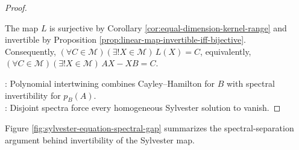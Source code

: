 \begin{theorem}
\begin{proof}
\begin{enumerate}[label=(\roman*)]
The map $L$ is surjective by Corollary \ref{cor:equal-dimension-kernel-range} and invertible by Proposition \ref{prop:linear-map-invertible-iff-bijective}.\\
Consequently, $(\forall C\in\mathcal{M})(\exists!X\in\mathcal{M})\,L(X)=C$, equivalently, $(\forall C\in\mathcal{M})(\exists!X\in\mathcal{M})\,AX-XB=C$.
\end{enumerate}
: Polynomial intertwining combines Cayley--Hamilton for $B$ with spectral invertibility for $p_B(A)$.\\
: Disjoint spectra force every homogeneous Sylvester solution to vanish.
\end{proof}
\end{theorem}

Figure \ref{fig:sylvester-equation-spectral-gap} summarizes the spectral-separation argument behind invertibility of the Sylvester map.

\begin{illustrationfigure}[H]
  \centering
  
  \caption{Disjoint spectra make $p_B(A)$ invertible, so the Sylvester map $L(X)=AX-XB$ is invertible.}
  \label{fig:sylvester-equation-spectral-gap}
\end{illustrationfigure}

